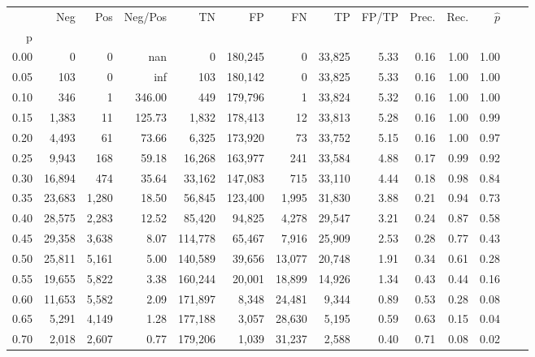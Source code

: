 \begin{tabular}{rrrrrrrrrrrrrr}
\toprule
{} &     Neg &    Pos & Neg/Pos &       TN &       FP &      FN &      TP & FP/TP & Prec. &  Rec. & $\hat{p}$ \\
p    &         &        &         &          &          &         &         &       &       &       &           \\
\midrule
0.00 &       0 &      0 &     nan &        0 &  180,245 &       0 &  33,825 &  5.33 &  0.16 &  1.00 &      1.00 \\
0.05 &     103 &      0 &     inf &      103 &  180,142 &       0 &  33,825 &  5.33 &  0.16 &  1.00 &      1.00 \\
0.10 &     346 &      1 &  346.00 &      449 &  179,796 &       1 &  33,824 &  5.32 &  0.16 &  1.00 &      1.00 \\
0.15 &   1,383 &     11 &  125.73 &    1,832 &  178,413 &      12 &  33,813 &  5.28 &  0.16 &  1.00 &      0.99 \\
0.20 &   4,493 &     61 &   73.66 &    6,325 &  173,920 &      73 &  33,752 &  5.15 &  0.16 &  1.00 &      0.97 \\
0.25 &   9,943 &    168 &   59.18 &   16,268 &  163,977 &     241 &  33,584 &  4.88 &  0.17 &  0.99 &      0.92 \\
0.30 &  16,894 &    474 &   35.64 &   33,162 &  147,083 &     715 &  33,110 &  4.44 &  0.18 &  0.98 &      0.84 \\
0.35 &  23,683 &  1,280 &   18.50 &   56,845 &  123,400 &   1,995 &  31,830 &  3.88 &  0.21 &  0.94 &      0.73 \\
0.40 &  28,575 &  2,283 &   12.52 &   85,420 &   94,825 &   4,278 &  29,547 &  3.21 &  0.24 &  0.87 &      0.58 \\
0.45 &  29,358 &  3,638 &    8.07 &  114,778 &   65,467 &   7,916 &  25,909 &  2.53 &  0.28 &  0.77 &      0.43 \\
0.50 &  25,811 &  5,161 &    5.00 &  140,589 &   39,656 &  13,077 &  20,748 &  1.91 &  0.34 &  0.61 &      0.28 \\
0.55 &  19,655 &  5,822 &    3.38 &  160,244 &   20,001 &  18,899 &  14,926 &  1.34 &  0.43 &  0.44 &      0.16 \\
0.60 &  11,653 &  5,582 &    2.09 &  171,897 &    8,348 &  24,481 &   9,344 &  0.89 &  0.53 &  0.28 &      0.08 \\
0.65 &   5,291 &  4,149 &    1.28 &  177,188 &    3,057 &  28,630 &   5,195 &  0.59 &  0.63 &  0.15 &      0.04 \\
0.70 &   2,018 &  2,607 &    0.77 &  179,206 &    1,039 &  31,237 &   2,588 &  0.40 &  0.71 &  0.08 &      0.02 \\

\end{tabular}
